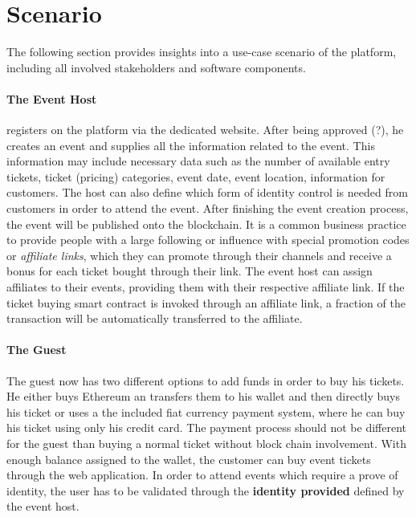 \section{Scenario}
The following section provides insights into a use-case scenario of the platform, including all involved stakeholders and software components.

\paragraph{The Event Host} registers on the platform via the dedicated website. After being approved (?), he creates an event and supplies all the information related to the event. This information may include necessary data such as the number of available entry tickets, ticket (pricing) categories, event date, event location, information for customers. The host can also define which form of identity control is needed from customers in order to attend the event. After finishing the event creation process, the event will be published onto the blockchain.
It is a common business practice to provide people with a large following or influence with special promotion codes or \textit{affiliate links}, which they can promote through their channels and receive a bonus for each ticket bought through their link. The event host can assign affiliates to their events, providing them with their respective affiliate link. If the ticket buying smart contract is invoked through an affiliate link, a fraction of the transaction will be automatically transferred to the affiliate.  

\paragraph{The Guest} %
The guest now has two different options to add funds in order to buy his tickets. He either buys Ethereum an transfers them to his wallet and then directly buys his ticket or uses a the included fiat currency payment system, where he can buy his ticket using only his credit card.
The payment process should not be different for the guest than buying a normal ticket without block chain involvement.
With enough balance assigned to the wallet, the customer can buy event tickets through the web application.
In order to attend events which require a prove of identity, the user has to be validated through the \textbf{identity provided} defined by the event host.

